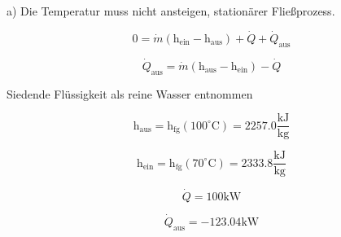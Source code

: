 a) Die Temperatur muss nicht ansteigen, stationärer Fließprozess.

\[
0 = \dot{m} (\text{h}_{\text{ein}} - \text{h}_{\text{aus}}) + \dot{Q} + \dot{Q}_{\text{aus}}
\]

\[
\dot{Q}_{\text{aus}} = \dot{m} (\text{h}_{\text{aus}} - \text{h}_{\text{ein}}) - \dot{Q}
\]

Siedende Flüssigkeit als reine Wasser entnommen

\[
\text{h}_{\text{aus}} = \text{h}_{\text{fg}} (100^\circ \text{C}) = 2257.0 \frac{\text{kJ}}{\text{kg}}
\]

\[
\text{h}_{\text{ein}} = \text{h}_{\text{fg}} (70^\circ \text{C}) = 2333.8 \frac{\text{kJ}}{\text{kg}}
\]

\[
\dot{Q} = 100 \text{kW}
\]

\[
\dot{Q}_{\text{aus}} = -123.04 \text{kW}
\]